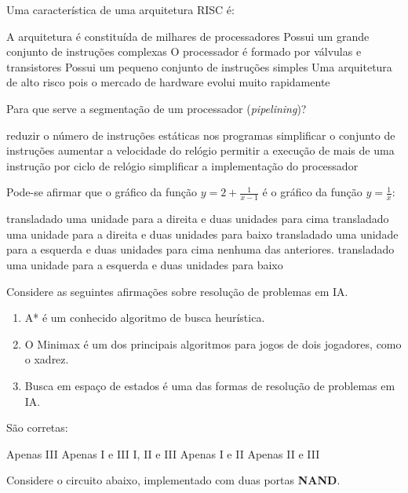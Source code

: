 \documentclass[12pt, addpoints]{exam}
\begin{document}
\begin{questions}
\question
Uma característica de uma arquitetura RISC é:
\begin{choices}
\choice A arquitetura é constituída de milhares de processadores
\choice Possui um grande conjunto de instruções complexas
\choice O processador é formado por válvulas e transistores
\choice Possui um pequeno conjunto de instruções simples
\choice Uma arquitetura de alto risco pois o mercado de hardware evolui muito rapidamente
\end{choices}

\question
Para que serve a segmentação de um processador (\textit{pipelining})?
\begin{choices}
\choice reduzir o número de instruções estáticas nos programas
\choice simplificar o conjunto de instruções
\choice aumentar a velocidade do relógio
\choice permitir a execução de mais de uma instrução por ciclo de relógio
\choice simplificar a implementação do processador
\end{choices}

\question
Pode-se afirmar que o gráfico da função \(y = 2 + \frac{1}{x - 1}\) é o gráfico da função \(y = \frac{1}{x}\):
\begin{choices}
\choice transladado uma unidade para a direita e duas unidades para cima
\choice transladado uma unidade para a direita e duas unidades para baixo
\choice transladado uma unidade para a esquerda e duas unidades para cima
\choice nenhuma das anteriores.
\choice transladado uma unidade para a esquerda e duas unidades para baixo
\end{choices}

\question
Considere as seguintes afirmações sobre resolução de problemas em IA.
\begin{enumerate}[label=\Roman*.]
    \item A* é um conhecido algoritmo de busca heurística.
    \item O Minimax é um dos principais algoritmos para jogos de dois jogadores, como o xadrez.
    \item Busca em espaço de estados é uma das formas de resolução de problemas em IA.
\end{enumerate}
São corretas:
\begin{choices}
\choice Apenas III
\choice Apenas I e III
\choice I, II e III
\choice Apenas I e II
\choice Apenas II e III
\end{choices}

\question
Considere o circuito abaixo, implementado com duas portas \textbf{NAND}.


\end{questions}
\end{document}
